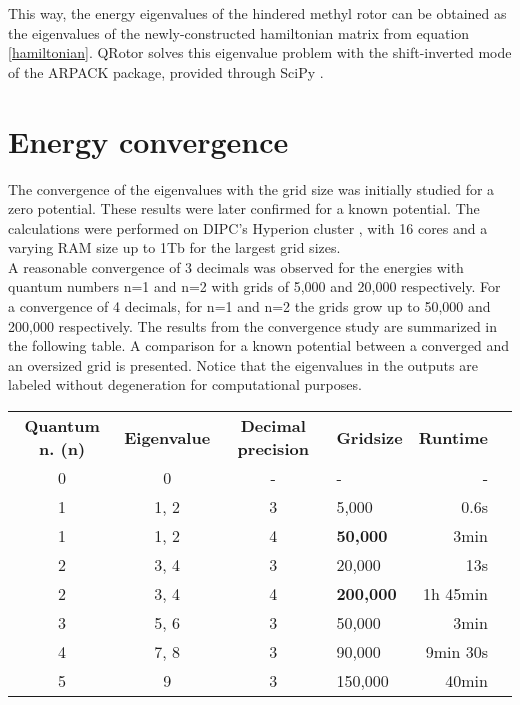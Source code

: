\documentclass[12pt,a4paper]{article}
\begin{document}
This way, the energy eigenvalues of the hindered methyl rotor can be obtained as the eigenvalues of the newly-constructed hamiltonian matrix from equation \eqref{hamiltonian}. QRotor solves this eigenvalue problem with the shift-inverted mode of the ARPACK package, provided through SciPy \cite{arpack}.


\section*{Energy convergence}

The convergence of the eigenvalues with the grid size was initially studied for a zero potential. These results were later confirmed for a known potential. The calculations were performed on DIPC's Hyperion cluster \cite{hyperion}, with 16 cores and a varying RAM size up to 1Tb for the largest grid sizes.\\

A reasonable convergence of 3 decimals was observed for the energies with quantum numbers n=1 and n=2 with grids of 5,000 and 20,000 respectively. For a convergence of 4 decimals, for n=1 and n=2 the grids grow up to 50,000 and 200,000 respectively. The results from the convergence study are summarized in the following table. A comparison for a known potential \cite{titov2023} between a converged and an oversized grid is presented. Notice that the eigenvalues in the outputs are labeled without degeneration for computational purposes.

\begin{table}[H]
    \centering
    \begin{tabular}{ccclrr}
        \textbf{Quantum n. (n)} & \textbf{Eigenvalue} & \textbf{Decimal precision} & \textbf{Gridsize} & \textbf{Runtime} \\
        0  & 0     & -   & -             & -         \\
        1  & 1, 2  & 3   & 5,000         & 0.6s      \\
        1  & 1, 2  & 4   & \bf{50,000}   & 3min      \\
        2  & 3, 4  & 3   & 20,000        & 13s       \\
        2  & 3, 4  & 4   & \bf{200,000}  & 1h 45min  \\
        3  & 5, 6  & 3   & 50,000        & 3min      \\
        4  & 7, 8  & 3   & 90,000        & 9min 30s  \\
        5  & 9     & 3   & 150,000       & 40min
    \end{tabular}
    \end{table}
\end{document}
